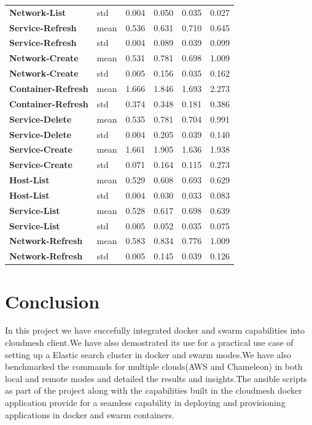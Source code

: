 \documentclass[9pt,twocolumn,twoside]{../../styles/osajnl}
\begin{document}
\begin{table}[h]
\begin{tabular}{|l|l|l|p{.86cm}|l|p{0.86cm}|}
\textbf{Network-List} & std & 0.004 & 0.050 & 0.035 & 0.027 \\
\textbf{Service-Refresh} & mean & 0.536 & 0.631 & 0.710 & 0.645 \\
\textbf{Service-Refresh} & std & 0.004 & 0.089 & 0.039 & 0.099 \\
\textbf{Network-Create} & mean & 0.531 & 0.781 & 0.698 & 1.009 \\
\textbf{Network-Create} & std & 0.005 & 0.156 & 0.035 & 0.162 \\
\textbf{Container-Refresh} & mean & 1.666 & 1.846 & 1.693 & 2.273 \\
\textbf{Container-Refresh} & std & 0.374 & 0.348 & 0.181 & 0.386 \\
\textbf{Service-Delete} & mean & 0.535 & 0.781 & 0.704 & 0.991 \\
\textbf{Service-Delete} & std & 0.004 & 0.205 & 0.039 & 0.140 \\
\textbf{Service-Create} & mean & 1.661 & 1.905 & 1.636 & 1.938 \\
\textbf{Service-Create} & std & 0.071 & 0.164 & 0.115 & 0.273 \\
\textbf{Host-List} & mean & 0.529 & 0.608 & 0.693 & 0.629 \\
\textbf{Host-List} & std & 0.004 & 0.030 & 0.033 & 0.083 \\
\textbf{Service-List} & mean & 0.528 & 0.617 & 0.698 & 0.639 \\
\textbf{Service-List} & std & 0.005 & 0.052 & 0.035 & 0.075 \\
\textbf{Network-Refresh} & mean & 0.583 & 0.834 & 0.776 & 1.009 \\
\textbf{Network-Refresh} & std & 0.005 & 0.145 & 0.039 & 0.126
\end{tabular}
\end{table}

\clearpage
\section{Conclusion}

In this project we have succefully integrated docker and swarm capabilities into
cloudmesh client.We have also demostrated its use for a practical use case of
setting up a Elastic search cluster in docker and swarm modes.We have also 
benchmarked the commands for multiple clouds(AWS and Chameleon) in both 
local and remote modes and detailed the results and insights.The ansible scripts
as part of the project along with the capabilities built in the cloudmesh docker 
application provide for a seamless capability in deploying and provisioning applications
in docker and swarm containers.
\end{document}
